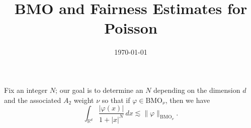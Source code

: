 \documentclass{amsart}
\title{BMO and Fairness Estimates for Poisson}
\date{\today}
\begin{document}
Fix an integer $N$; our goal is to determine an $N$ depending on the dimension $d$ and the associated $A_2$ weight $\nu$ so that if $\varphi \in \text{BMO}_{\nu}$, then we have
$$\int_{\mathbb{R}^d} \frac{|\varphi(x)|}{1 + |x|^N} \, dx \lesssim \|\varphi\|_{\text{BMO}_{\nu}}.$$
\end{document}
